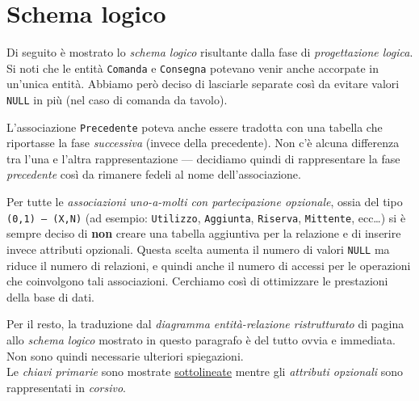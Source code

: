 \section{Schema logico}\label{sec:scheme}
Di seguito è mostrato lo {\it schema logico} risultante dalla fase di {\it progettazione logica}.\\

Si noti che le entità {\tt Comanda} e {\tt Consegna} potevano venir anche accorpate in un'unica entità. Abbiamo
però deciso di lasciarle separate così da evitare valori {\tt NULL} in più (nel caso di comanda da tavolo).

L'associazione {\tt Precedente} poteva anche essere tradotta con una tabella che riportasse
la fase {\it successiva} (invece della precedente). Non c'è alcuna differenza
tra l'una e l'altra rappresentazione --- decidiamo quindi di rappresentare la fase
{\it precedente} così da rimanere fedeli al nome dell'associazione.

Per tutte le {\it associazioni uno-a-molti con partecipazione opzionale}, ossia del tipo {\tt (0,1) --- (X,N)} (ad
esempio: {\tt Utilizzo}, {\tt Aggiunta}, {\tt Riserva}, {\tt Mittente}, ecc\ldots) si è sempre
deciso di {\bf non} creare una tabella aggiuntiva per la relazione e di inserire invece
attributi opzionali. Questa scelta aumenta il numero di valori {\tt NULL} ma riduce il numero
di relazioni, e quindi anche il numero di accessi per le operazioni che coinvolgono tali
associazioni. Cerchiamo così di ottimizzare le prestazioni della base di dati.

Per il resto, la traduzione dal {\it diagramma entità-relazione ristrutturato} di pagina \pageref{diagram.2}
allo {\it schema logico} mostrato in questo paragrafo è del tutto ovvia e immediata. Non
sono quindi necessarie ulteriori spiegazioni.\\

Le {\it chiavi primarie} sono mostrate \underline{sottolineate} mentre gli {\it attributi opzionali}
sono rappresentati in \textit{corsivo}.

